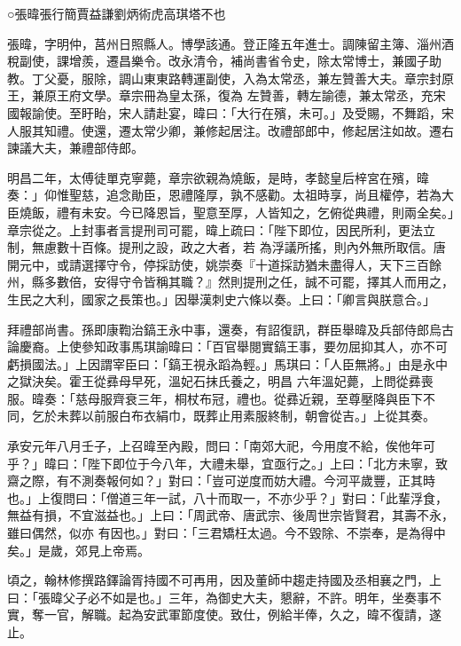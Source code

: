 
\begin{pinyinscope}

 ○張暐張行簡賈益謙劉炳術虎高琪塔不也



 張暐，字明仲，莒州日照縣人。博學該通。登正隆五年進士。調陳留主簿、淄州酒稅副使，課增羨，遷昌樂令。改永清令，補尚書省令史，除太常博士，兼國子助教。丁父憂，服除，調山東東路轉運副使，入為太常丞，兼左贊善大夫。章宗封原王，兼原王府文學。章宗冊為皇太孫，復為
 左贊善，轉左諭德，兼太常丞，充宋國報諭使。至盱眙，宋人請赴宴，暐曰：「大行在殯，未可。」及受賜，不舞蹈，宋人服其知禮。使還，遷太常少卿，兼修起居注。改禮部郎中，修起居注如故。遷右諫議大夫，兼禮部侍郎。



 明昌二年，太傅徒單克寧薨，章宗欲親為燒飯，是時，孝懿皇后梓宮在殯，暐奏：」仰惟聖慈，追念勛臣，恩禮隆厚，孰不感勸。太祖時享，尚且權停，若為大臣燒飯，禮有未安。今已降恩旨，聖意至厚，人皆知之，乞俯從典禮，則兩全矣。」章宗從之。上封事者言提刑司可罷，暐上疏曰：「陛下即位，因民所利，更法立制，無慮數十百條。提刑之設，政之大者，若
 為浮議所搖，則內外無所取信。唐開元中，或請選擇守令，停採訪使，姚崇奏『十道採訪猶未盡得人，天下三百餘州，縣多數倍，安得守令皆稱其職？』然則提刑之任，誠不可罷，擇其人而用之，生民之大利，國家之長策也。」因舉漢刺史六條以奏。上曰：「卿言與朕意合。」



 拜禮部尚書。孫即康鞫治鎬王永中事，還奏，有詔復訊，群臣舉暐及兵部侍郎烏古論慶裔。上使參知政事馬琪諭暐曰：「百官舉閱實鎬王事，要勿屈抑其人，亦不可虧損國法。」上因謂宰臣曰：「鎬王視永蹈為輕。」馬琪曰：「人臣無將。」由是永中之獄決矣。霍王從彞母早死，溫妃石抹氏養之，明昌
 六年溫妃薨，上問從彞喪服。暐奏：「慈母服齊衰三年，桐杖布冠，禮也。從彞近親，至尊壓降與臣下不同，乞於未葬以前服白布衣絹巾，既葬止用素服終制，朝會從吉。」上從其奏。



 承安元年八月壬子，上召暐至內殿，問曰：「南郊大祀，今用度不給，俟他年可乎？」暐曰：「陛下即位于今八年，大禮未舉，宜亟行之。」上曰：「北方未寧，致齋之際，有不測奏報何如？」對曰：「豈可逆度而妨大禮。今河平歲豐，正其時也。」上復問曰：「僧道三年一試，八十而取一，不亦少乎？」對曰：「此輩浮食，無益有損，不宜滋益也。」上曰：「周武帝、唐武宗、後周世宗皆賢君，其壽不永，雖曰偶然，似亦
 有因也。」對曰：「三君矯枉太過。今不毀除、不崇奉，是為得中矣。」是歲，郊見上帝焉。



 頃之，翰林修撰路鐸論胥持國不可再用，因及董師中趨走持國及丞相襄之門，上曰：「張暐父子必不如是也。」三年，為御史大夫，懇辭，不許。明年，坐奏事不實，奪一官，解職。起為安武軍節度使。致仕，例給半俸，久之，暐不復請，遂止。




\end{pinyinscope}
